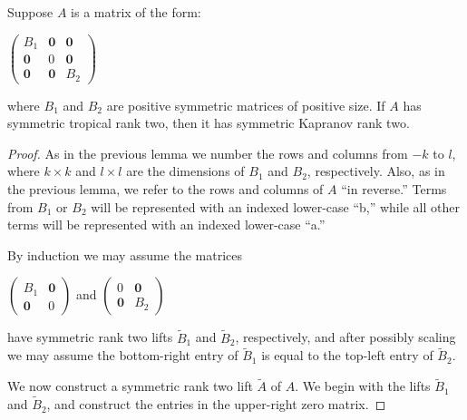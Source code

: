 \documentclass{article}
\begin{document}
\begin{lem}
  Suppose $A$ is a matrix of the form:  
  \begin{center}  
    $\left(\begin{array}{ccc} B_{1} & \textbf{0} & \textbf{0} \\ \textbf{0} & 0 & \textbf{0} \\ \textbf{0} & \textbf{0} & B_{2}\end{array}\right)$
  \end{center}
  where $B_{1}$ and $B_{2}$ are positive symmetric matrices of positive size. If $A$ has symmetric tropical rank two, then it has symmetric Kapranov rank two.
\end{lem}

\begin{proof}
  As in the previous lemma we number the rows and columns from $-k$ to $l$, where $k \times k$ and $l \times l$ are the dimensions of $B_{1}$ and $B_{2}$, respectively. Also, as in the previous lemma, we refer to the rows and columns of $A$ ``in reverse.'' Terms from $B_{1}$ or $B_{2}$ will be represented with an indexed lower-case ``b,'' while all other terms will be represented with an indexed lower-case ``a.'' 
  
  By induction we may assume the matrices
  \begin{center}
    $\left(\begin{array}{cc} B_{1} & \textbf{0} \\ \textbf{0} & 0 \end{array}\right)$ \hspace{.1 in} and \hspace{.1 in} $\left(\begin{array}{cc} 0 & \textbf{0} \\ \textbf{0} & B_{2} \end{array}\right)$
  \end{center}
  have symmetric rank two lifts $\tilde{B}_{1}$ and $\tilde{B}_{2}$, respectively, and after possibly scaling we may assume the bottom-right entry of $\tilde{B}_{1}$ is equal to the top-left entry of $\tilde{B}_{2}$.
  
  We now construct a symmetric rank two lift $\tilde{A}$ of $A$. We begin with the lifts $\tilde{B}_{1}$ and $\tilde{B}_{2}$, and construct the entries in the upper-right zero matrix.
  

\end{proof}
\end{document}
